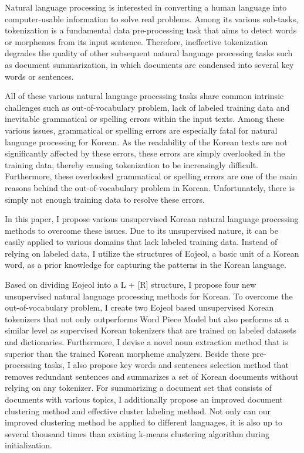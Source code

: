 \documentclass[oneside, ko,phd]{snuthesis_utf8_kor}
\begin{document}
\begin{abstractalt}
Natural language processing is interested in converting a human language into computer-usable information to solve real problems.
Among its various sub-tasks, tokenization is a fundamental data pre-processing task that aims to detect words or morphemes from its input sentence.
Therefore, ineffective tokenization degrades the quality of other subsequent natural language processing tasks such as document summarization, in which documents are condensed into several key words or sentences.

All of these various natural language processing tasks share common intrinsic challenges such as out-of-vocabulary problem, lack of labeled training data and inevitable grammatical or spelling errors within the input texts.
Among these various issues, grammatical or spelling errors are especially fatal for natural language processing for Korean.
As the readability of the Korean texts are not significantly affected by these errors, these errors are simply overlooked in the training data, thereby causing tokenization to be increasingly difficult.
Furthermore, these overlooked grammatical or spelling errors are one of the main reasons behind the out-of-vocabulary problem in Korean.
Unfortunately, there is simply not enough training data to resolve these errors.

In this paper, I propose various unsupervised Korean natural language processing methods to overcome these issues.
Due to its unsupervised nature, it can be easily applied to various domains that lack labeled training data.
Instead of relying on labeled data, I utilize the structures of Eojeol, a basic unit of a Korean word, as a prior knowledge for capturing the patterns in the Korean language.

Based on dividing Eojeol into a L + [R] structure, I propose four new unsupervised natural language processing methods for Korean. 
To overcome the out-of-vocabulary problem, I create two Eojeol based unsupervised Korean tokenizers that not only outperforms Word Piece Model but also performs at a similar level as supervised Korean tokenizers that are trained on labeled datasets and dictionaries.
Furthermore, I devise a novel noun extraction method that is superior than the trained Korean morpheme analyzers.
Beside these pre-processing tasks, I also propose key words and sentences selection method that removes redundant sentences and summarizes a set of Korean documents without relying on any tokenizer.
For summarizing a document set that consists of documents with various topics, I additionally propose an improved document clustering method and effective cluster labeling method. Not only can our improved clustering method be applied to different languages, it is also up to several thousand times than existing k-means clustering algorithm during initialization. 


\end{abstractalt}
\end{document}
